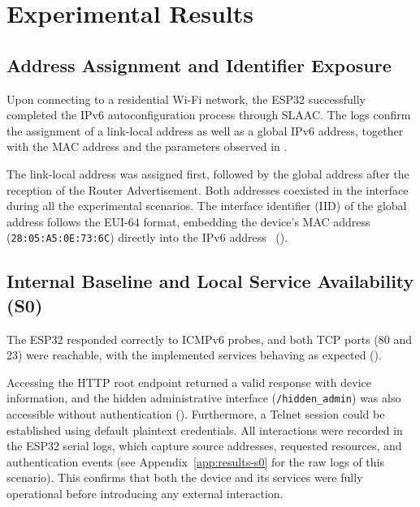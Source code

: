 \chapter{Experimental Results}\label{chap:results}

\section{Address Assignment and Identifier Exposure}\label{sec:results-addressing}
Upon connecting to a residential Wi-Fi network, the ESP32 successfully completed the IPv6 autoconfiguration process through SLAAC. The logs confirm the assignment of a link-local address as well as a global IPv6 address, together with the MAC address and the parameters observed in .

The link-local address was assigned first, followed by the global address after the reception of the Router Advertisement. Both addresses coexisted in the interface during all the experimental scenarios.
The interface identifier (IID) of the global address follows the EUI-64 format, embedding the device's MAC address (\texttt{28:05:A5:0E:73:6C}) directly into the IPv6 address~\cite{rye2023ipvseeyou} ().

\section{Internal Baseline and Local Service Availability (S0)}\label{sec:results-s0}
The ESP32 responded correctly to ICMPv6 probes, and both TCP ports (80 and 23) were reachable, with the implemented services behaving as expected ().

Accessing the HTTP root endpoint returned a valid response with device information, and the hidden administrative interface (\texttt{/hidden\_admin}) was also accessible without authentication (). Furthermore, a Telnet session could be established using default plaintext credentials.
All interactions were recorded in the ESP32 serial logs, which capture source addresses, requested resources, and authentication events (see Appendix~\ref{app:results-s0} for the raw logs of this scenario). This confirms that both the device and its services were fully operational before introducing any external interaction.

